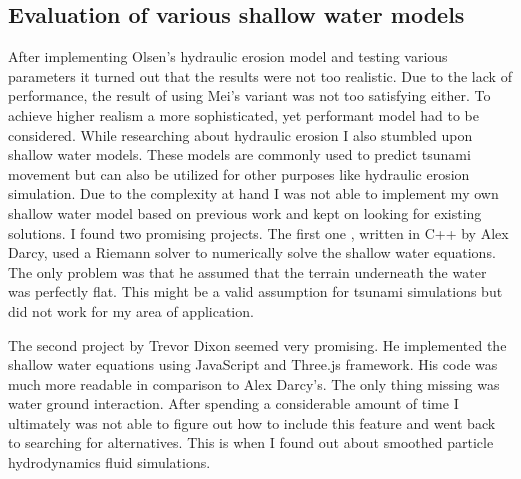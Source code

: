 \documentclass[11pt,a4paper,twoside,openright]{report}
\begin{document}
\subsection{Evaluation of various shallow water models}
After implementing Olsen's hydraulic erosion model and testing various parameters it turned out that the results were not too realistic. Due to the lack of performance, the result of using Mei's variant was not too satisfying either. To achieve higher realism a more sophisticated, yet performant model had to be considered. While researching about hydraulic erosion I also stumbled upon shallow water models. These models are commonly used to predict tsunami movement but can also be utilized for other purposes like hydraulic erosion simulation. Due to the complexity at hand I was not able to implement my own shallow water model based on previous work and kept on looking for existing solutions. I found two promising projects. The first one \cite{Darcy}, written in C++ by Alex Darcy, used a Riemann solver to numerically solve the shallow water equations. The only problem was that he assumed that the terrain underneath the water was perfectly flat. This might be a valid assumption for tsunami simulations but did not work for my area of application.

The second project \cite{Dixon} by Trevor Dixon seemed very promising. He implemented the shallow water equations using JavaScript and Three.js framework. His code was much more readable in comparison to Alex Darcy's. The only thing missing was water ground interaction. After spending a considerable amount of time I ultimately was not able to figure out how to include this feature and went back to searching for alternatives. This is when I found out about smoothed particle hydrodynamics fluid simulations.
\end{document}
